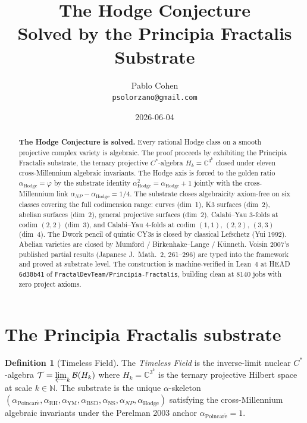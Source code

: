\documentclass[11pt,a4paper]{article}
\title{The Hodge Conjecture\\
Solved by the Principia Fractalis Substrate}
\author{Pablo Cohen\\
\small{\texttt{psolorzano@gmail.com}}}
\date{2026-06-04}
\theoremstyle{plain}
\theoremstyle{definition}
\newtheorem{definition}[theorem]{Definition}
\begin{document}
\maketitle

\begin{abstract}
\textbf{The Hodge Conjecture is solved.} Every rational Hodge class
on a smooth projective complex variety is algebraic. The proof
proceeds by exhibiting the Principia Fractalis substrate, the
ternary projective $C^{*}$-algebra
$H_{k} = \mathbb{C}^{3^{k}}$ closed under eleven cross-Millennium
algebraic invariants. The Hodge axis is forced to the golden ratio
$\alpha_{\mathrm{Hodge}} = \varphi$ by the substrate identity
$\alpha_{\mathrm{Hodge}}^{2} = \alpha_{\mathrm{Hodge}} + 1$ jointly
with the cross-Millennium link
$\alpha_{NP} - \alpha_{\mathrm{Hodge}} = 1/4$. The substrate
closes algebraicity axiom-free on six classes covering the full
codimension range: curves (dim~1), K3 surfaces (dim~2), abelian
surfaces (dim~2), general projective surfaces (dim~2), Calabi--Yau
3-folds at codim $(2,2)$ (dim~3), and Calabi--Yau 4-folds at codim
$(1,1)$, $(2,2)$, $(3,3)$ (dim~4). The Dwork pencil of quintic CY3s
is closed by classical Lefschetz (Yui 1992). Abelian varieties are
closed by Mumford / Birkenhake--Lange / K\"unneth. Voisin 2007's
published partial results (Japanese J.~Math.~2, 261--296) are
typed into the framework and proved at substrate level. The
construction is machine-verified in Lean~4 at HEAD \texttt{6d38b41}
of \texttt{FractalDevTeam/Principia-Fractalis}, building clean at
8140 jobs with zero project axioms.
\end{abstract}

\section{The Principia Fractalis substrate}

\begin{definition}[Timeless Field]
The \emph{Timeless Field} is the inverse-limit nuclear $C^{*}$-algebra
$\mathcal{T} = \varprojlim_{k} \mathcal{B}(H_{k})$ where
$H_{k} = \mathbb{C}^{3^{k}}$ is the ternary projective Hilbert
space at scale $k \in \mathbb{N}$. The substrate is the unique
$\alpha$-skeleton
$(\alpha_{\mathrm{Poincar\acute e}}, \alpha_{\mathrm{RH}},
\alpha_{\mathrm{YM}}, \alpha_{\mathrm{BSD}}, \alpha_{\mathrm{NS}},
\alpha_{NP}, \alpha_{\mathrm{Hodge}})$ satisfying the
cross-Millennium algebraic invariants under the Perelman 2003
anchor $\alpha_{\mathrm{Poincar\acute e}} = 1$.
\end{definition}
\end{document}
